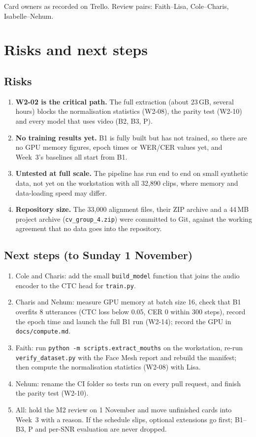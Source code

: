 \documentclass[11pt,a4paper]{article}
\newcommand{\code}[1]{\texttt{\small #1}}
\begin{document}
\smallskip
{\small Card owners as recorded on Trello. Review pairs: Faith--Lisa, Cole--Charis, Isabelle--Nehum.}

\section{Risks and next steps}

\subsection{Risks}
\begin{enumerate}
  \item \textbf{W2-02 is the critical path.} The full extraction (about 23\,GB,
        several hours) blocks the normalisation statistics (W2-08), the parity
        test (W2-10) and every model that uses video (B2, B3, P).
  \item \textbf{No training results yet.} B1 is fully built but has not
        trained, so there are no GPU memory figures, epoch times or WER/CER
        values yet, and Week~3's baselines all start from B1.
  \item \textbf{Untested at full scale.} The pipeline has run end to end on
        small synthetic data, not yet on the workstation with all 32,890 clips,
        where memory and data-loading speed may differ.
  \item \textbf{Repository size.} The 33,000 alignment files, their ZIP archive
        and a 44\,MB project archive (\code{cv\_group\_4.zip}) were committed to
        Git, against the working agreement that no data goes into the repository.
\end{enumerate}

\subsection{Next steps (to Sunday 1 November)}
\begin{enumerate}
  \item Cole and Charis: add the small \code{build\_model} function that joins
        the audio encoder to the CTC head for \code{train.py}.
  \item Charis and Nehum: measure GPU memory at batch size 16, check that B1
        overfits 8 utterances (CTC loss below 0.05, CER 0 within 300 steps),
        record the epoch time and launch the full B1 run (W2-14); record the
        GPU in \code{docs/compute.md}.
  \item Faith: run \code{python -m scripts.extract\_mouths} on the workstation,
        re-run \code{verify\_dataset.py} with the Face Mesh report and rebuild
        the manifest; then compute the normalisation statistics (W2-08) with Lisa.
  \item Nehum: rename the CI folder so tests run on every pull request, and
        finish the parity test (W2-10).
  \item All: hold the M2 review on 1 November and move unfinished cards into
        Week~3 with a reason. If the schedule slips, optional extensions go
        first; B1--B3, P and per-SNR evaluation are never dropped.
\end{enumerate}
\end{document}
